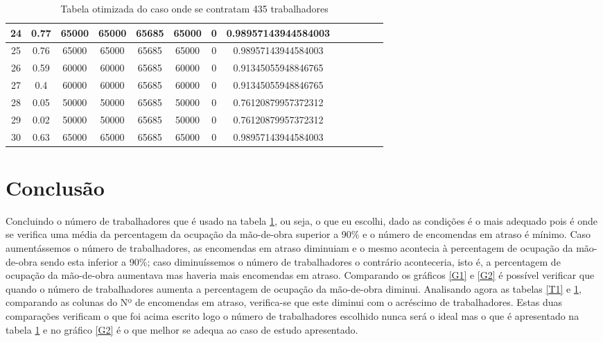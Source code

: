 \documentclass[10pt,a4paper,titlepage]{report}
\begin{document}
\begin{center}
\begin{table}
\begin{tabular}{ | c | c | c | c | c | c | c | c | c | c | c | c | c | }
	24 & 0.77 & 65000 & 65000 & 65685 & 65000 & 0 & 0.98957143944584003  \\ \hline
	25 & 0.76 & 65000 & 65000 & 65685 & 65000 & 0 & 0.98957143944584003  \\ \hline
	26 & 0.59 & 60000 & 60000 & 65685 & 60000 & 0 & 0.91345055948846765  \\ \hline
	27 & 0.4 & 60000 & 60000 & 65685 & 60000 & 0 & 0.91345055948846765  \\ \hline
	28 & 0.05 & 50000 & 50000 & 65685 & 50000 & 0 & 0.76120879957372312  \\ \hline
	29 & 0.02 & 50000 & 50000 & 65685 & 50000 & 0 & 0.76120879957372312 \\ \hline
	30 & 0.63 & 65000 & 65000 & 65685 & 65000 & 0 & 0.98957143944584003 \\ \hline
\end{tabular}
\caption{Tabela otimizada do caso onde se contratam 435 trabalhadores}
\label{T2}
\end{table}
\end{center}
\chapter{Conclusão}
	Concluindo o número de trabalhadores que é usado na tabela \ref{T2}, ou seja, o que eu escolhi, dado as condições é o mais adequado pois é onde se verifica uma média da percentagem da ocupação da mão-de-obra superior a 90\% e o número de encomendas em atraso é mínimo. Caso aumentássemos o número de trabalhadores, as encomendas em atraso diminuiam e o mesmo acontecia à percentagem de ocupação da mão-de-obra sendo esta inferior a 90\%; caso diminuíssemos o número de trabalhadores o contrário aconteceria, isto é, a percentagem de ocupação da mão-de-obra aumentava mas haveria mais encomendas em atraso. Comparando os gráficos \ref{G1} e \ref{G2} é possível verificar que quando o número de trabalhadores aumenta a percentagem de ocupação da mão-de-obra diminui. Analisando agora as tabelas \ref{T1} e \ref{T2}, comparando as colunas do Nº de encomendas em atraso, verifica-se que este diminui com o acréscimo de trabalhadores. Estas duas comparações verificam o que foi acima escrito logo o número de trabalhadores escolhido nunca será o ideal mas o que é apresentado na tabela \ref{T2} e no gráfico \ref{G2} é o que melhor se adequa ao caso de estudo apresentado.



\nocite{Imagem_Capa}
\nocite{Significado_Vacina}
\nocite{Vacina_para_que_serve}
\nocite{Vantagens_Desvantagens1}
\nocite{Vantagens_Desvantagens2}
\nocite{Vantagens_Desvantagens3}
\end{document}
